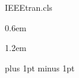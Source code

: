 \begin{filecontents*}[overwrite]{IEEEtran.cls}
\def\IEEElabelindentfactori{1.0}   %
\def\IEEElabelindentfactorii{0.75} %
\def\IEEElabelindentfactoriii{0.0} %
\def\IEEElabelindentfactoriv{0.0}
\def\IEEElabelindentfactorv{0.0}
\def\IEEElabelindentfactorvi{0.0}

\def\IEEElabelindentfactor{1.0}

\newdimen\IEEEiednormlabelsep
\IEEEiednormlabelsep 0.6em

\newdimen\IEEEiedmathlabelsep
\IEEEiedmathlabelsep 1.2em

\newskip\IEEEiedtopsep
\IEEEiedtopsep 2pt plus 1pt minus 1pt


\def\IEEEiedlistdecl{\relax}


\end{filecontents*}
